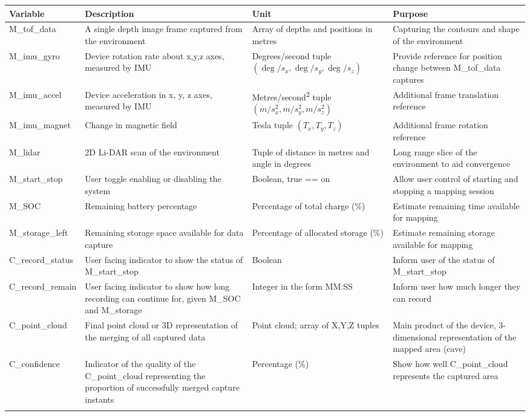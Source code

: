 \documentclass[11pt]{article}
\begin{document}
		\begin{tabularx}{\textwidth}{p{}  X  X  X}
			\toprule
			\textbf{Variable} & \textbf{Description} & \textbf{Unit} & \textbf{Purpose} \\
			\midrule
			M\_tof\_data & A single depth image frame captured from the environment  & Array of depths and positions in metres  & Capturing the contours and shape of the environment \\
			\midrule
			M\_imu\_gyro & Device rotation rate about x,y,z axes, measured by IMU  & Degrees/second tuple $(\deg/s_{x},\deg/s_{y},\deg/s_{z})$ & Provide reference for position change between M\_tof\_data captures  \\
			\midrule
			M\_imu\_accel & Device acceleration in x, y, z axes, measured by IMU & Metres/second\textsuperscript{2} tuple $(m/s^{2}_{x},m/s^{2}_{y},m/s^{2}_{z})$ & Additional frame translation reference  \\
			\midrule
			M\_imu\_magnet & Change in magnetic field  & Tesla tuple $(T_{x},T_{y},T_{z})$  & Additional frame rotation reference \\
			\midrule
			M\_lidar & 2D Li-DAR scan of the environment & Tuple of distance in metres and angle in degrees & Long range slice of the environment to aid convergence \\
			\midrule
			M\_start\_stop & User toggle enabling or disabling the system & Boolean, true == on & Allow user control of starting and stopping a mapping session \\
			\midrule
			M\_SOC & Remaining battery percentage & Percentage of total charge (\%) & Estimate remaining time available for mapping \\
			\midrule
			M\_storage\_left & Remaining storage space available for data capture & Percentage of allocated storage (\%)& Estimate remaining storage available for mapping \\
			\midrule
			C\_record\_status & User facing indicator to show the status of M\_start\_stop & Boolean & Inform user of the status of M\_start\_stop \\
			\midrule
			C\_record\_remain & User facing indicator to show how long recording can continue for, given M\_SOC and M\_storage & Integer in the form MM:SS & Inform user how much longer they can record \\
			\midrule
			C\_point\_cloud & Final point cloud or 3D representation of the merging of all captured data & Point cloud; array of X,Y,Z tuples & Main product of the device, 3-dimensional representation of the mapped area (cave)\\
			\midrule
			C\_confidence & Indicator of the quality of the C\_point\_cloud representing the proportion of successfully merged capture instants &  Percentage (\%) & Show how well C\_point\_cloud represents the captured area \\
			\bottomrule
			\caption{Variables and its description}
		\end{tabularx}
\end{document}
